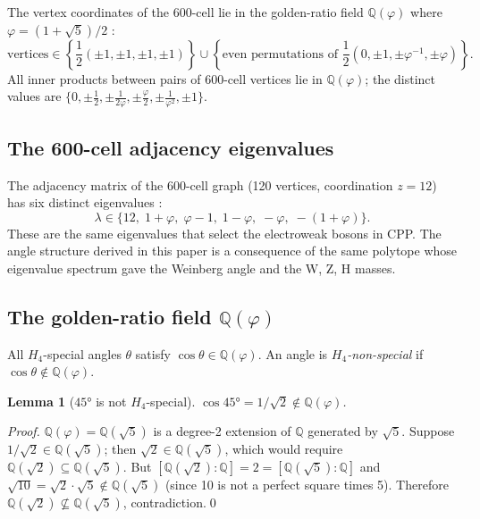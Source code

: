 \documentclass[11pt,a4paper]{article}
\newtheorem{lemma}[theorem]{Lemma}
\newcommand{\phig}{\varphi}
\begin{document}
The vertex coordinates of the 600-cell lie in the golden-ratio field
$\mathbb{Q}(\phig)$ where $\phig = (1+\sqrt5)/2$
\citep{coxeter1973,brouwer1989}:
\begin{equation}
\text{vertices} \in
\left\{\frac{1}{2}(\pm1,\pm1,\pm1,\pm1)\right\}
\cup
\left\{\text{even permutations of }
\frac{1}{2}(0,\pm1,\pm\phig^{-1},\pm\phig)\right\}.
\label{eq:vertices}
\end{equation}
All inner products between pairs of 600-cell vertices lie in
$\mathbb{Q}(\phig)$; the distinct values are
$\{0, \pm\frac{1}{2}, \pm\frac{1}{2\phig}, \pm\frac{\phig}{2},
\pm\frac{1}{\phig^2}, \pm1\}$.

\subsection{The 600-cell adjacency eigenvalues}

The adjacency matrix of the 600-cell graph (120 vertices,
coordination $z=12$) has six distinct eigenvalues
\citep{cpp_ew_unified}:
\begin{equation}
\lambda \in \{12,\;1+\phig,\;\phig-1,\;1-\phig,\;-\phig,\;-(1+\phig)\}.
\label{eq:eigenvalues}
\end{equation}
These are the same eigenvalues that select the electroweak bosons
in CPP.  The angle structure derived in this paper is a consequence
of the same polytope whose eigenvalue spectrum gave the Weinberg angle
and the W, Z, H masses.

\subsection{The golden-ratio field $\mathbb{Q}(\phig)$}

All $H_4$-special angles $\theta$ satisfy
$\cos\theta \in \mathbb{Q}(\phig)$.  An angle is
\emph{$H_4$-non-special} if $\cos\theta \notin \mathbb{Q}(\phig)$.

\begin{lemma}[$45°$ is not $H_4$-special]
\label{lem:45}
$\cos 45° = 1/\sqrt{2} \notin \mathbb{Q}(\phig)$.
\end{lemma}

\begin{proof}
$\mathbb{Q}(\phig) = \mathbb{Q}(\sqrt5)$ is a degree-2 extension of
$\mathbb{Q}$ generated by $\sqrt5$.  Suppose $1/\sqrt2 \in
\mathbb{Q}(\sqrt5)$; then $\sqrt2 \in \mathbb{Q}(\sqrt5)$, which
would require $\mathbb{Q}(\sqrt2) \subseteq \mathbb{Q}(\sqrt5)$.
But $[\mathbb{Q}(\sqrt2):\mathbb{Q}] = 2 = [\mathbb{Q}(\sqrt5):\mathbb{Q}]$
and $\sqrt{10} = \sqrt2\cdot\sqrt5 \notin \mathbb{Q}(\sqrt5)$ (since
10 is not a perfect square times 5).  Therefore $\mathbb{Q}(\sqrt2)
\not\subseteq \mathbb{Q}(\sqrt5)$, contradiction.\qed
\end{proof}
\end{document}
